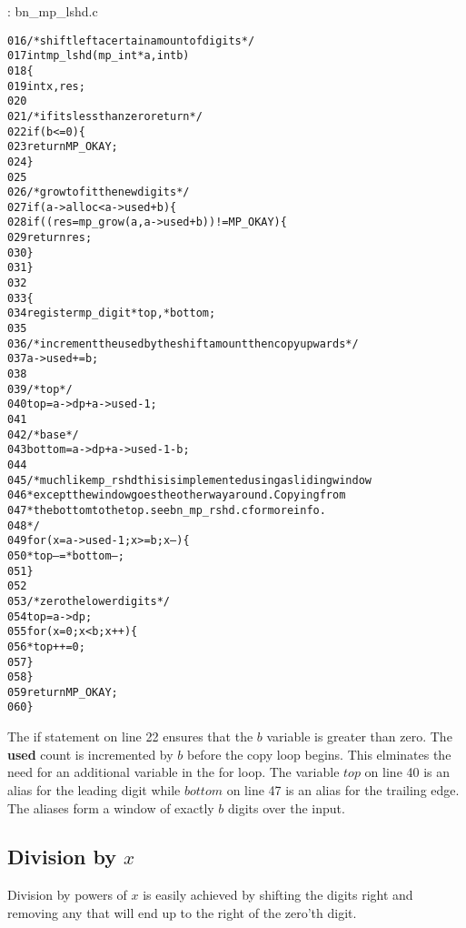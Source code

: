 \documentclass[b5paper]{book}
\begin{document}
\vspace{+3mm}\begin{small}
\hspace{-5.1mm}{\bf File}: bn\_mp\_lshd.c
\vspace{-3mm}
\begin{alltt}
016   /* shift left a certain amount of digits */
017   int mp_lshd (mp_int * a, int b)
018   \{
019     int     x, res;
020   
021     /* if its less than zero return */
022     if (b <= 0) \{
023       return MP_OKAY;
024     \}
025   
026     /* grow to fit the new digits */
027     if (a->alloc < a->used + b) \{
028        if ((res = mp_grow (a, a->used + b)) != MP_OKAY) \{
029          return res;
030        \}
031     \}
032   
033     \{
034       register mp_digit *top, *bottom;
035   
036       /* increment the used by the shift amount then copy upwards */
037       a->used += b;
038   
039       /* top */
040       top = a->dp + a->used - 1;
041   
042       /* base */
043       bottom = a->dp + a->used - 1 - b;
044   
045       /* much like mp_rshd this is implemented using a sliding window
046        * except the window goes the otherway around.  Copying from
047        * the bottom to the top.  see bn_mp_rshd.c for more info.
048        */
049       for (x = a->used - 1; x >= b; x--) \{
050         *top-- = *bottom--;
051       \}
052   
053       /* zero the lower digits */
054       top = a->dp;
055       for (x = 0; x < b; x++) \{
056         *top++ = 0;
057       \}
058     \}
059     return MP_OKAY;
060   \}
\end{alltt}
\end{small}

The if statement on line 22 ensures that the $b$ variable is greater than zero.  The \textbf{used} count is incremented by $b$ before
the copy loop begins.  This elminates the need for an additional variable in the for loop.  The variable $top$ on line 40 is an alias
for the leading digit while $bottom$ on line 47 is an alias for the trailing edge.  The aliases form a window of exactly $b$ digits
over the input.  

\subsection{Division by $x$}

Division by powers of $x$ is easily achieved by shifting the digits right and removing any that will end up to the right of the zero'th digit.  
\end{document}
